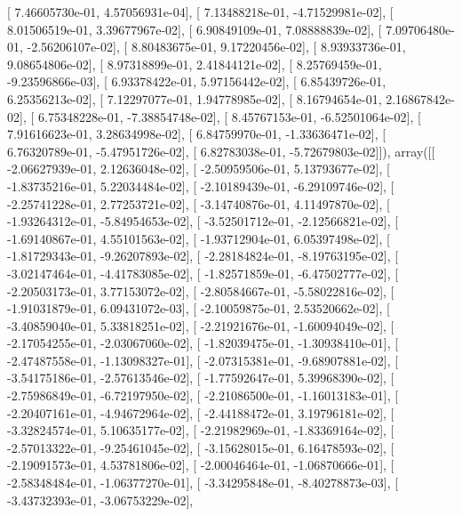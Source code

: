 \documentclass{article}
\begin{document}
       [  7.46605730e-01,   4.57056931e-04],
       [  7.13488218e-01,  -4.71529981e-02],
       [  8.01506519e-01,   3.39677967e-02],
       [  6.90849109e-01,   7.08888839e-02],
       [  7.09706480e-01,  -2.56206107e-02],
       [  8.80483675e-01,   9.17220456e-02],
       [  8.93933736e-01,   9.08654806e-02],
       [  8.97318899e-01,   2.41844121e-02],
       [  8.25769459e-01,  -9.23596866e-03],
       [  6.93378422e-01,   5.97156442e-02],
       [  6.85439726e-01,   6.25356213e-02],
       [  7.12297077e-01,   1.94778985e-02],
       [  8.16794654e-01,   2.16867842e-02],
       [  6.75348228e-01,  -7.38854748e-02],
       [  8.45767153e-01,  -6.52501064e-02],
       [  7.91616623e-01,   3.28634998e-02],
       [  6.84759970e-01,  -1.33636471e-02],
       [  6.76320789e-01,  -5.47951726e-02],
       [  6.82783038e-01,  -5.72679803e-02]]), array([[ -2.06627939e-01,   2.12636048e-02],
       [ -2.50959506e-01,   5.13793677e-02],
       [ -1.83735216e-01,   5.22034484e-02],
       [ -2.10189439e-01,  -6.29109746e-02],
       [ -2.25741228e-01,   2.77253721e-02],
       [ -3.14740876e-01,   4.11497870e-02],
       [ -1.93264312e-01,  -5.84954653e-02],
       [ -3.52501712e-01,  -2.12566821e-02],
       [ -1.69140867e-01,   4.55101563e-02],
       [ -1.93712904e-01,   6.05397498e-02],
       [ -1.81729343e-01,  -9.26207893e-02],
       [ -2.28184824e-01,  -8.19763195e-02],
       [ -3.02147464e-01,  -4.41783085e-02],
       [ -1.82571859e-01,  -6.47502777e-02],
       [ -2.20503173e-01,   3.77153072e-02],
       [ -2.80584667e-01,  -5.58022816e-02],
       [ -1.91031879e-01,   6.09431072e-03],
       [ -2.10059875e-01,   2.53520662e-02],
       [ -3.40859040e-01,   5.33818251e-02],
       [ -2.21921676e-01,  -1.60094049e-02],
       [ -2.17054255e-01,  -2.03067060e-02],
       [ -1.82039475e-01,  -1.30938410e-01],
       [ -2.47487558e-01,  -1.13098327e-01],
       [ -2.07315381e-01,  -9.68907881e-02],
       [ -3.54175186e-01,  -2.57613546e-02],
       [ -1.77592647e-01,   5.39968390e-02],
       [ -2.75986849e-01,  -6.72197950e-02],
       [ -2.21086500e-01,  -1.16013183e-01],
       [ -2.20407161e-01,  -4.94672964e-02],
       [ -2.44188472e-01,   3.19796181e-02],
       [ -3.32824574e-01,   5.10635177e-02],
       [ -2.21982969e-01,  -1.83369164e-02],
       [ -2.57013322e-01,  -9.25461045e-02],
       [ -3.15628015e-01,   6.16478593e-02],
       [ -2.19091573e-01,   4.53781806e-02],
       [ -2.00046464e-01,  -1.06870666e-01],
       [ -2.58348484e-01,  -1.06377270e-01],
       [ -3.34295848e-01,  -8.40278873e-03],
       [ -3.43732393e-01,  -3.06753229e-02],
\end{document}
